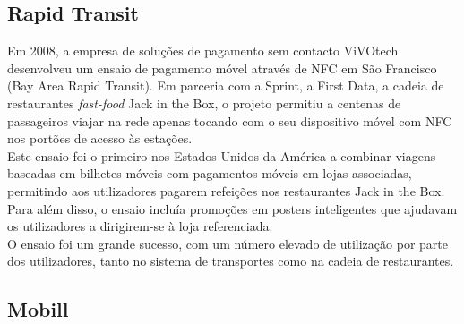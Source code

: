 \subsection{Rapid Transit}

Em 2008, a empresa de soluções de pagamento sem contacto ViVOtech desenvolveu um ensaio de pagamento móvel através de NFC em São Francisco (Bay Area Rapid Transit). Em parceria com a Sprint, a First Data, a cadeia de restaurantes \textit{fast-food} Jack in the Box, o projeto permitiu a centenas de passageiros viajar na rede apenas tocando com o seu dispositivo móvel com NFC nos portões de acesso às estações.
\\Este ensaio foi o primeiro nos Estados Unidos da América a combinar viagens baseadas em bilhetes móveis com pagamentos móveis em lojas associadas, permitindo aos utilizadores pagarem refeições nos restaurantes Jack in the Box. Para além disso, o ensaio incluía promoções em posters inteligentes que ajudavam os utilizadores a dirigirem-se à loja referenciada.
\\O ensaio foi um grande sucesso, com um número elevado de utilização por parte dos utilizadores, tanto no sistema de transportes como na cadeia de restaurantes.\cite{NFCForum2011} \cite{Casey2000}

\subsection{Mobill} 

